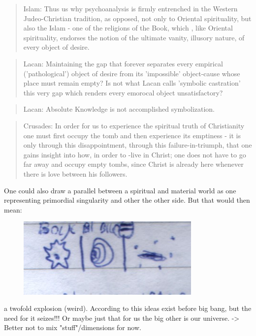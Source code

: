 \documentclass{book}
\begin{document}
\begin{quotation}
Islam: Thus us why psychoanalysis is firmly entrenched in the Western Judeo-Christian tradition, as opposed, not only to Oriental spirituality, but also the Islam - one of the religions of the Book, which , like Oriental spirituality, endorses the notion of the ultimate vanity, illusory nature, of every object of desire.
\end{quotation}
\begin{quotation}
Lacan: Maintaining the gap that forever separates every empirical ('pathological') object of desire from its 'impossible' object-cause whose place must remain empty? Is not what Lacan calls 'symbolic castration' this very gap which renders every emorocal object unsatisfactory?
\end{quotation}
\begin{quotation}
Lacan: Absolute Knowledge is not accomplished symbolization.
\end{quotation}
\begin{quotation}
Crusades: In order for us to experience the spiritual truth of Christianity one must first occupy the tomb and then experience its emptiness - it is only through this disappointment, through this failure-in-triumph, that one gains insight into how, in order to -live in Christ; one does not have to go far away and occupy empty tombs, since Christ is already here whenever there is love between his followers.
\end{quotation}


One could also draw a parallel between a spiritual and material world as one representing primordial singularity and other the other side. But that would then mean: 
\begin{figure}[ht!]
\centering
\includegraphics[width=90mm]{scan10.jpg}
\label{overflow}
\end{figure}
a twofold explosion (weird). According to this ideas exist before big bang, but the need for it seizes!!! Or maybe just that for us the big other is our universe. -> Better not to mix "stuff"/dimensions for now.
\end{document}
